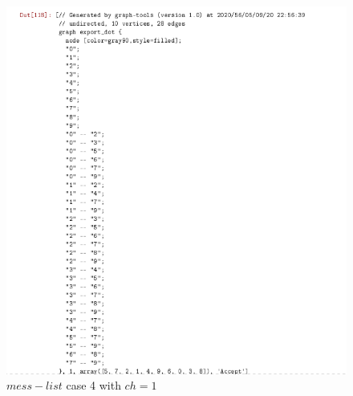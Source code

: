 \documentclass[12pt,a4paper]{article}
\begin{document}
\begin{itemize}
\begin{figure}[h]
	\centering
	\includegraphics[width=0.95\linewidth]{3-28}
	\caption{$mess-list$ case 4 with $ch=1$}
	\label{fig:3-28}
\end{figure}\\
\end{itemize}

%
%
\end{document}
